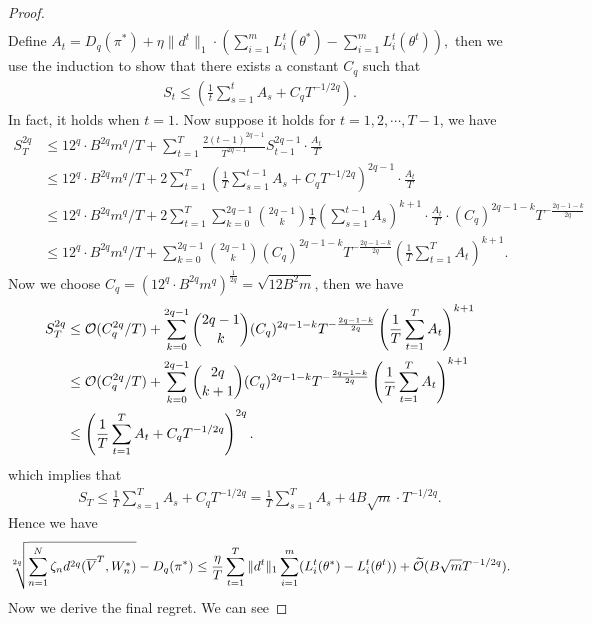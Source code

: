 \begin{proof}
\begin{align*}
\end{align*}
Define $A_t =  D_q(\pi^*) + \eta \|d^t\|_1\cdot \left(\sum_{i=1}^m L_i^t(\theta^*) - \sum_{i=1}^m L_i^t(\theta^t)\right),$ then we use the induction to show that there exists a constant $C_q$ such that 
\begin{align}
    S_{t} \le  \left(\frac{1}{t}\sum_{s=1}^t A_s + C_qT^{-1/2q}\right). \nonumber
\end{align}
In fact, it holds when $t = 1$. Now suppose it holds for $t=1,2,\cdots, T-1$, we have 
\begin{align*}
    S_T^{2q}&\le 12^q\cdot B^{2q}m^q/T +  \sum_{t=1}^T \frac{2(t-1)^{2q-1}}{T^{2q-1}}S_{t-1}^{2q-1}\cdot \frac{A_t}{T}\\
    &\le 12^q\cdot B^{2q}m^q/T + 2\sum_{t=1}^T \left(\frac{1}{T}\sum_{s=1}^{t-1}A_s + C_qT^{-1/2q}\right)^{2q-1} \cdot \frac{A_t}{T}\\
    &\le 12^q\cdot B^{2q}m^q/T + 2\sum_{t=1}^T \sum_{k=0}^{2q-1}\binom{2q-1}{k}\frac{1}{T}\left(\sum_{s=1}^{t-1}A_s\right)^{k+1}\cdot \frac{A_t}{T}\cdot (C_q)^{2q-1-k}T^{-\frac{2q-1-k}{2q}}\\
    &\le 12^q\cdot B^{2q}m^q/T  + \sum_{k=0}^{2q-1}\binom{2q-1}{k}(C_q)^{2q-1-k}T^{-\frac{2q-1-k}{2q}}\left(\frac{1}{T}\sum_{t=1}^T A_t\right)^{k+1}.
\end{align*}
Now we choose $C_q = (12^q\cdot B^{2q}m^q)^{\frac{1}{2q}} = \sqrt{12B^2m}$, then we have 
\begin{align*}
    S_T^{2q} &\le \mathcal{O}(C_q^{2q}/T)  + \sum_{k=0}^{2q-1}\binom{2q-1}{k}(C_q)^{2q-1-k}T^{-\frac{2q-1-k}{2q}}\left(\frac{1}{T}\sum_{t=1}^T A_t\right)^{k+1}\\
    &\le \mathcal{O}(C_q^{2q}/T)  + \sum_{k=0}^{2q-1}\binom{2q}{k+1}(C_q)^{2q-1-k}T^{-\frac{2q-1-k}{2q}}\left(\frac{1}{T}\sum_{t=1}^T A_t\right)^{k+1}\\
    &\le \left(\frac{1}{T}\sum_{t=1}^T A_t + C_qT^{-1/2q} \right)^{2q}.
\end{align*}
which implies that 
\begin{align}
    S_T \le  \frac{1}{T}\sum_{s=1}^T A_s + C_qT^{-1/2q}=\frac{1}{T}\sum_{s=1}^T A_s + 4B\sqrt{m}\cdot T^{-1/2q}.
\end{align}
Hence we have 
\begin{align*}
    \sqrt[2q]{\sum_{n=1}^N\zeta_n d^{2q}(\overline{V}^T , W_n^*)} - D_q(\pi^*)\le \frac{\eta}{T}\sum_{t=1}^T\|d^t\|_1\sum_{i=1}^m (L_i^t(\theta^*) -L_i^t(\theta^t)) + \widetilde{\mathcal{O}}(B\sqrt{m} T^{-1/2q}).
\end{align*}
Now we derive the final regret. We can see 

\end{proof}
